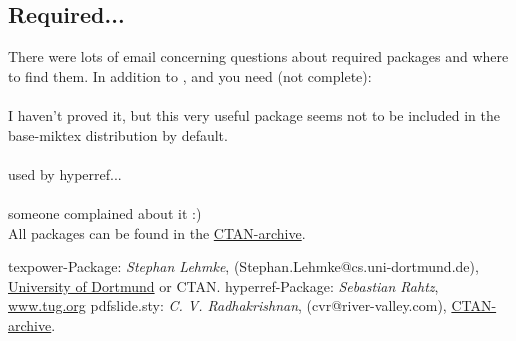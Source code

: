 \documentclass[a4paper,KOMA,landscape]{powersem}
\begin{document}
\begin{slide}
\section{Required...}
There were lots of email concerning questions about required packages and where to find them. In addition to ,  and  you need (not complete):\\[2ex]
\\ I haven't proved it, but this very useful package seems not to be included in the base-miktex distribution by default.\\[1ex]
\\ used by hyperref...\\[1ex]
\\ someone complained about it :)\\[2ex]
All packages can be found in the \href{http://www.dante.de}{CTAN-archive}.
\end{slide}
\begin{slide}
  \begin{thebibliography}{99}
   {\ttfamily texpower}-Package: {\sl Stephan Lehmke}, 
    (Stephan.Lehmke@cs.uni-dortmund.de), 
    \href{http://ls1-www.cs.uni-dortmund.de/~lehmke/texpower}{University of Dortmund} or CTAN.
   {\ttfamily hyperref}-Package: {\sl Sebastian Rahtz}, 
    \href{http://www.tug.org/applications/hyperref}{www.tug.org}
   {\ttfamily pdfslide.sty}: {\sl C. V. Radhakrishnan},
    (cvr@river-valley.com), \href{http://www.dante.de}{CTAN-archive}. 
  \end{thebibliography}
\end{slide}
\end{document}
